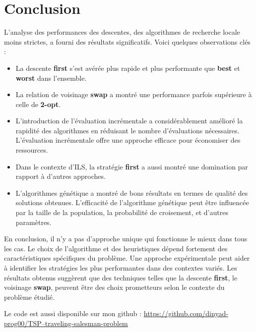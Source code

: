 \section{Conclusion}
L'analyse des performances des descentes, des algorithmes de recherche locale moins strictes, a fourni des résultats significatifs. Voici quelques observations clés :

\begin{itemize}
	\item La descente \textbf{first} s'est avérée plus rapide et plus performante que \textbf{best} et \textbf{worst} dans l'ensemble.


\item La relation de voisinage \textbf{swap} a montré une performance parfois supérieure à celle de \textbf{2-opt}.


\item L'introduction de l'évaluation incrémentale a considérablement amélioré la rapidité des algorithmes en réduisant le nombre d'évaluations nécessaires. L'évaluation incrémentale offre une approche efficace pour économiser des ressources.

\item Dans le contexte d'ILS, la stratégie \textbf{first} a aussi montré une domination par rapport à d'autres approches.


\item L'algorithmes génétique a montré de bons résultats en termes de qualité des solutions obtenues. L'efficacité de l'algorithme génétique peut être influencée par la taille de la population, la probabilité de croisement, et d'autres paramètres.

\end{itemize}
En conclusion, il n'y a pas d'approche unique qui fonctionne le mieux dans tous les cas. Le choix de l'algorithme et des heuristiques dépend fortement des caractéristiques spécifiques du problème. Une approche expérimentale peut aider à identifier les stratégies les plus performantes dans des contextes variés. Les résultats obtenus suggèrent que des techniques telles que la descente \textbf{first}, le voisinage \textbf{swap},  peuvent être des choix prometteurs selon le contexte du problème étudié.
\newline

Le code est aussi disponible sur mon github :
\href{}{https://github.com/dinyad-prog00/TSP--traveling-salesman-problem} 


